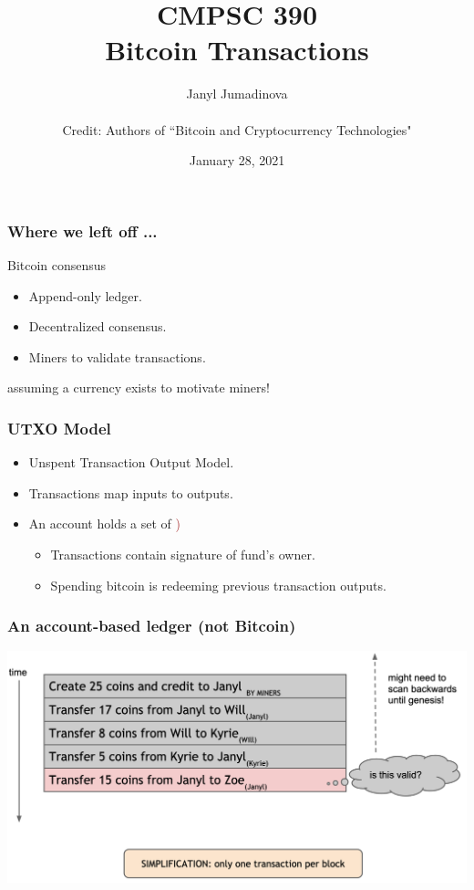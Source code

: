 \documentclass{beamer}
\title{CMPSC 390 \\ Bitcoin Transactions}
\author{Janyl Jumadinova \\ $ $ \\ Credit: Authors of ``Bitcoin and Cryptocurrency Technologies"}
\date{January 28, 2021}
\begin{document}
\begin{frame}
  \titlepage
\end{frame}

\begin{frame}
  \frametitle{Where we left off ... }
  Bitcoin consensus
  \begin{itemize}
  	\item Append-only ledger. 
  	\item Decentralized consensus.
  	\item Miners to validate transactions.
  \end{itemize}
  \pause
  assuming a currency exists to motivate miners!
\end{frame}
\begin{frame}
  \frametitle{UTXO Model}
  \begin{itemize}
  	\item Unspent Transaction Output Model. 
  	\pause
  	\item Transactions map inputs to outputs.
  	\item An account holds a set of \textcolor{brown}{)}
  		\begin{itemize}
  			\item Transactions contain signature of fund's owner.
  			\item Spending bitcoin is redeeming previous transaction outputs.
  		\end{itemize}
  \end{itemize}
\end{frame}

\begin{frame}
  \frametitle{An account-based ledger (not Bitcoin)}
  
\centering
	\includegraphics[scale=0.25]{1-1}
\end{frame}
\end{document}
